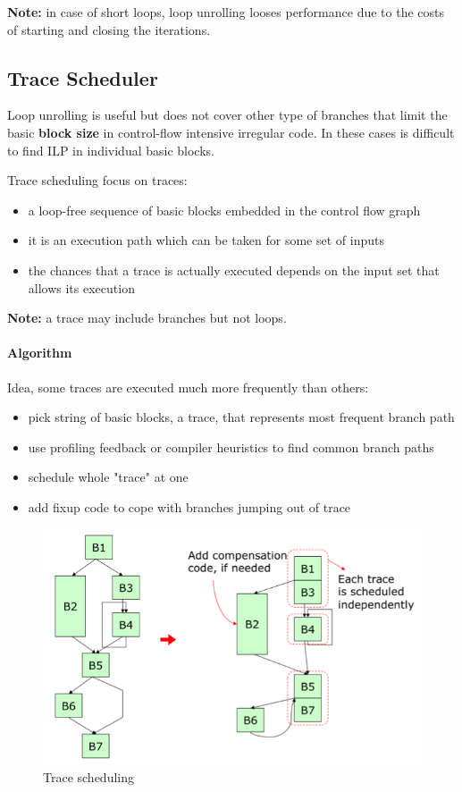 \textbf{Note:} in case of short loops, loop unrolling looses performance due to the costs of starting and closing the
iterations.

\subsection{Trace Scheduler}\label{subsec:trace-scheduler}
Loop unrolling is useful but does not cover other type of branches that limit the basic \textbf{block size} in
control-flow intensive irregular code.
In these cases is difficult to find ILP in individual basic blocks.

Trace scheduling focus on traces:
\begin{itemize}
    \item a loop-free sequence of basic blocks embedded in the control flow graph
    \item it is an execution path which can be taken for some set of inputs
    \item the chances that a trace is actually executed depends on the input set that allows its execution
\end{itemize}

\textbf{Note:} a trace may include branches but not loops.

\paragraph{Algorithm} Idea, some traces are executed much more frequently than others:
\begin{itemize}
    \item pick string of basic blocks, a trace, that represents most frequent branch path
    \item use profiling feedback or compiler heuristics to find common branch paths
    \item schedule whole "trace" at one
    \item add fixup code to cope with branches jumping out of trace
\end{itemize}
\begin{figure}[h]
    \centering
    \includegraphics[scale = 0.45]{images/trace-scheduling}
    \caption{Trace scheduling}
    \label{fig:trace-scheduling}
\end{figure}

